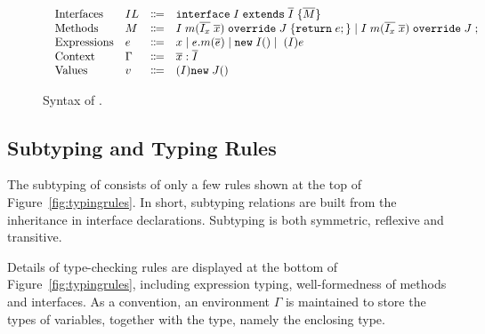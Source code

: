 \begin{figure*}[t]
\saveSpaceFig
\begin{displaymath}
\begin{array}{l}
\begin{array}{llrl}
\text{Interfaces}   & IL & \Coloneqq & \texttt{interface} \; I \; \texttt{extends} \; \overline{I} \; {\{} \overline{M} {\}} \\
\text{Methods}      & M  & \Coloneqq & I \; m (\overline{I_x} \; \overline{x}) \; \texttt{override} \; J \; {\{} \texttt{return} \; e ; {\}}  \mid
									   I \; m (\overline{I_x} \; \overline{x}) \; \texttt{override} \; J \; ; \\
\text{Expressions}  & e  & \Coloneqq & x \mid
e.m(\overline{e}) \mid
\texttt{new} \; I() \mid \; (I)e \\
\text{Context}      & \Gamma & \Coloneqq & \overline{x}:\overline{I} \\
\text{Values}       & v & \Coloneqq & (I) \texttt{new} \; J() \\
\end{array}
\end{array}
\end{displaymath}
\caption{Syntax of \name{}.}\label{fig:syntax}
\saveSpaceFig
\end{figure*}

\subsection{Subtyping and Typing Rules}
The subtyping of \MIM{} consists of only a few rules shown at the top of Figure~\ref{fig:typingrules}.
In short, subtyping relations are built from the inheritance in interface
declarations. Subtyping is both symmetric, reflexive and transitive.

Details of type-checking rules are displayed at the bottom of Figure~\ref{fig:typingrules}, including expression
typing, well-formedness of methods and interfaces. As a convention, an environment
$\Gamma$ is maintained to store the types of variables, together with
the \kwthis type, namely
the enclosing type. 

